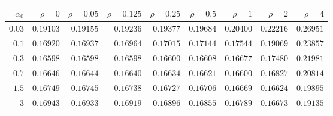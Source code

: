 \begin{tabular}{rrrrrrrrr}
\hline
$\alpha_0$ & $\rho=0$ & $\rho=0.05$ & $\rho=0.125$ & $\rho=0.25$ & $\rho=0.5$ & $\rho=1$ & $\rho=2$ & $\rho=4$ \\
\hline
$0.03$ & $0.19103$ & $0.19155$ & $0.19236$ & $0.19377$ & $0.19684$ & $0.20400$ & $0.22216$ & $0.26951$ \\
$0.1$ & $0.16920$ & $0.16937$ & $0.16964$ & $0.17015$ & $0.17144$ & $0.17544$ & $0.19069$ & $0.23857$ \\
$0.3$ & $0.16598$ & $\mathbf{0.16598}$ & $0.16598$ & $0.16600$ & $0.16608$ & $0.16677$ & $0.17480$ & $0.21981$ \\
$0.7$ & $0.16646$ & $0.16644$ & $0.16640$ & $0.16634$ & $0.16621$ & $0.16600$ & $0.16827$ & $0.20814$ \\
$1.5$ & $0.16749$ & $0.16745$ & $0.16738$ & $0.16727$ & $0.16706$ & $0.16669$ & $0.16624$ & $0.19895$ \\
$3$ & $0.16943$ & $0.16933$ & $0.16919$ & $0.16896$ & $0.16855$ & $0.16789$ & $0.16673$ & $0.19135$ \\
\hline
\end{tabular}
